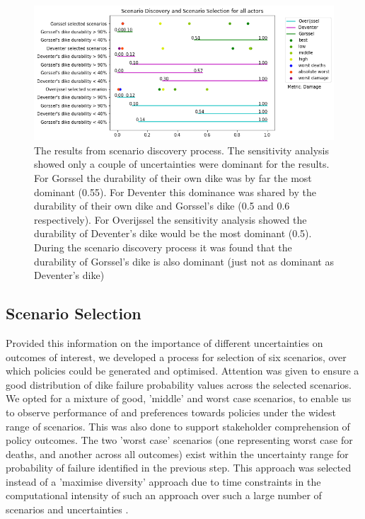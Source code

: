 \begin{figure}[h]
    \centering
    \includegraphics[width=\textwidth]{report/figures/results/scenario_discovery.png}
    \caption{The results from scenario discovery process. The sensitivity analysis showed only a couple of uncertainties were dominant for the results. For Gorssel the durability of their own dike was by far the most dominant (0.55). For Deventer this dominance was shared by the durability of their own dike and Gorssel's dike (0.5 and 0.6 respectively). For Overijssel the sensitivity analysis showed the durability of Deventer's dike would be the most dominant (0.5). During the scenario discovery process it was found that the durability of Gorssel's dike is also dominant (just not as dominant as Deventer's dike)}
    \label{fig:msmordm}
\end{figure}


\subsection{Scenario Selection}
Provided this information on the importance of different uncertainties on outcomes of interest, we developed a process for selection of six scenarios, over which policies could be generated and optimised. Attention was given to ensure a good distribution of dike failure probability values across the selected scenarios. We opted for a mixture of good, 'middle' and worst case scenarios, to enable us to observe performance of and preferences towards policies under the widest range of scenarios. This was also done to support stakeholder comprehension of policy outcomes. The two 'worst case' scenarios (one representing worst case for deaths, and another across all outcomes) exist within the uncertainty range for probability of failure identified in the previous step. This approach was selected instead of a 'maximise diversity' approach due to time constraints in the computational intensity of such an approach over such a large number of scenarios and uncertainties \parencite{eker_including_2018}.


